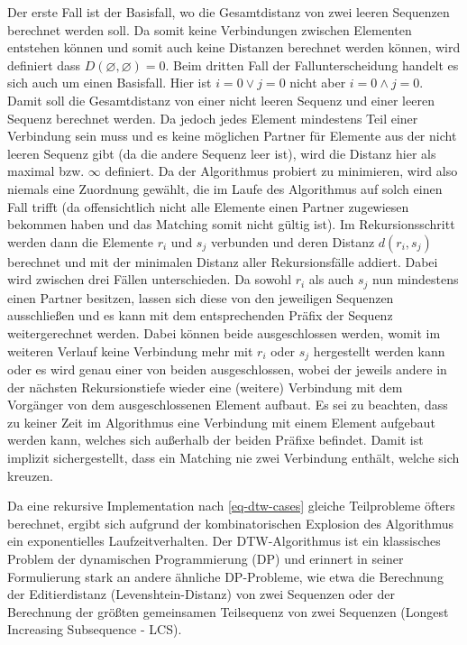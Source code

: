 \documentclass{whswinvcbook}
\begin{document}
Der erste Fall ist der Basisfall, wo die Gesamtdistanz von zwei leeren Sequenzen berechnet werden soll. Da somit keine Verbindungen zwischen Elementen entstehen können und somit auch keine Distanzen berechnet werden können, wird definiert dass $D(\varnothing,\varnothing)=0$. Beim dritten Fall der Fallunterscheidung handelt es sich auch um einen Basisfall. Hier ist $i=0\lor j=0$ nicht aber $i=0\land j=0$. Damit soll die Gesamtdistanz von einer nicht leeren Sequenz und einer leeren Sequenz berechnet werden. Da jedoch jedes Element mindestens Teil einer Verbindung sein muss und es keine möglichen Partner für Elemente aus der nicht leeren Sequenz gibt (da die andere Sequenz leer ist), wird die Distanz hier als maximal bzw. $\infty$ definiert. Da der Algorithmus probiert zu minimieren, wird also niemals eine Zuordnung gewählt, die im Laufe des Algorithmus auf solch einen Fall trifft (da offensichtlich nicht alle Elemente einen Partner zugewiesen bekommen haben und das Matching somit nicht gültig ist). Im Rekursionsschritt werden dann die Elemente $r_i$ und $s_j$ verbunden und deren Distanz $d(r_i,s_j)$ berechnet und mit der minimalen Distanz aller Rekursionsfälle addiert. Dabei wird zwischen drei Fällen unterschieden. Da sowohl $r_i$ als auch $s_j$ nun mindestens einen Partner besitzen, lassen sich diese von den jeweiligen Sequenzen ausschließen und es kann mit dem entsprechenden Präfix der Sequenz weitergerechnet werden. Dabei können beide ausgeschlossen werden, womit im weiteren Verlauf keine Verbindung mehr mit $r_i$ oder $s_j$ hergestellt werden kann oder es wird genau einer von beiden ausgeschlossen, wobei der jeweils andere in der nächsten Rekursionstiefe wieder eine (weitere) Verbindung mit dem Vorgänger von dem ausgeschlossenen Element aufbaut. Es sei zu beachten, dass zu keiner Zeit im Algorithmus eine Verbindung mit einem Element aufgebaut werden kann, welches sich außerhalb der beiden Präfixe befindet. Damit ist implizit sichergestellt, dass ein Matching nie zwei Verbindung enthält, welche sich kreuzen.

Da eine rekursive Implementation nach \ref{eq-dtw-cases} gleiche Teilprobleme öfters berechnet, ergibt sich aufgrund der kombinatorischen Explosion des Algorithmus ein exponentielles Laufzeitverhalten. Der DTW-Algorithmus ist ein klassisches Problem der dynamischen Programmierung (DP) und erinnert in seiner Formulierung stark an andere ähnliche DP-Probleme, wie etwa die Berechnung der Editierdistanz (Levenshtein-Distanz) von zwei Sequenzen oder der Berechnung der größten gemeinsamen Teilsequenz von zwei Sequenzen (Longest Increasing Subsequence - LCS).
\end{document}
